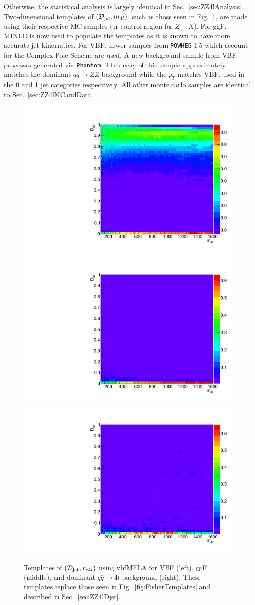 Otherwise, the statistical analysis is largely identical to Sec.~\ref{sec:ZZ4lAnalysis}. Two-dimensional templates of $(\mathcal{D}_{\rm{jet}},m_{4l})$, such as those seen in Fig.~\ref{fig:vbfMELATemplates}, are made using their respective MC samples (or control region for $Z+X$). For ggF, MINLO is now used to populate the templates as it is known to have more accurate jet kinematics. For VBF, newer samples from {\tt POWHEG} 1.5 which account for the Complex Pole Scheme are used. A new background sample from VBF processes generated via {\tt Phantom}. The decay of this sample approximately matches the dominant $q\bar{q}\rightarrow ZZ$ background while the $p_{T}$ matches VBF, used in the 0 and 1 jet categories respectively. All other monte carlo samples are identical to Sec.~\ref{sec:ZZ4lMCandData}.

\begin{figure}[htbp]
\begin{center}
\includegraphics[width=.3\linewidth]{HiggsProperties/figures/qqH_Djet_template.pdf}
\includegraphics[width=.3\linewidth]{HiggsProperties/figures/ggH_Djet_template.pdf}
\includegraphics[width=.3\linewidth]{HiggsProperties/figures/qqZZ_Djet_template.pdf}
\caption[Templates of $\mathcal{D}_{\rm{jet}}$ Using vbfMELA]{Templates of $(\mathcal{D}_{\rm{jet}},m_{4l})$ using vbfMELA for VBF (left), ggF (middle), and dominant $q\bar{q}\rightarrow 4l$ background (right). These templates replace those seen in Fig.~\ref{fig:FisherTemplates} and described in Sec.~\ref{sec:ZZ4lDjet}.}
\label{fig:vbfMELATemplates}
\end{center}
\end{figure}

